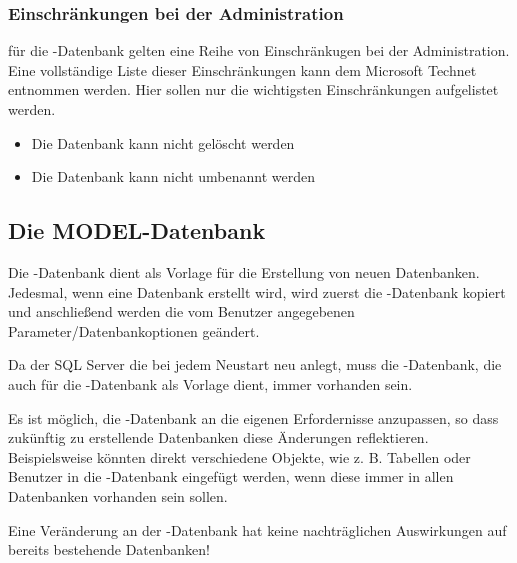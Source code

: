         \subsubsection{Einschränkungen bei der Administration}
          f\"ur die -Datenbank gelten eine Reihe von
          Einschränkugen bei der Administration. Eine vollständige Liste dieser
          Einschränkungen kann dem Microsoft Technet entnommen werden. Hier
          sollen nur die wichtigsten Einschränkungen aufgelistet werden.
          \begin{itemize}
            \item Die Datenbank kann nicht gelöscht werden
            \item Die Datenbank kann nicht umbenannt werden
          \end{itemize}
          \begin{literaturinternet}
            \item \cite{ms187112}
          \end{literaturinternet} 
      \subsection{Die MODEL-Datenbank}
        Die -Datenbank dient als Vorlage f\"ur die Erstellung
        von neuen Datenbanken. Jedesmal, wenn eine Datenbank erstellt wird, wird
        zuerst die -Datenbank kopiert und anschließend werden
        die vom Benutzer angegebenen Parameter/Datenbankoptionen geändert.
        \begin{merke}
          Da der SQL Server die  bei jedem Neustart neu
          anlegt, muss die -Datenbank, die auch f\"ur die
          -Datenbank als Vorlage dient, immer vorhanden sein.
        \end{merke}
        Es ist möglich, die -Datenbank an die
        eigenen Erfordernisse anzupassen, so dass zukünftig zu erstellende
        Datenbanken diese Änderungen reflektieren. Beispielsweise
        könnten direkt verschiedene Objekte, wie z. B. Tabellen oder Benutzer in
        die -Datenbank eingefügt werden, wenn diese immer in
        allen Datenbanken vorhanden sein sollen.
        \begin{merke}
          Eine Veränderung an der -Datenbank hat keine
          nachträglichen Auswirkungen auf bereits bestehende Datenbanken!
        \end{merke}
